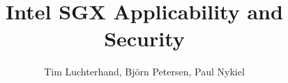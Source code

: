 \documentclass[vspaper,language=english]{acmart} %
\begin{document}
\title{Intel SGX Applicability and Security}

\author{Tim Luchterhand, Björn Petersen, Paul Nykiel} 

\begin{abstract}
    
\end{abstract}
\maketitle
{}





\appendix
{}

\nocite{*}

\end{document}
